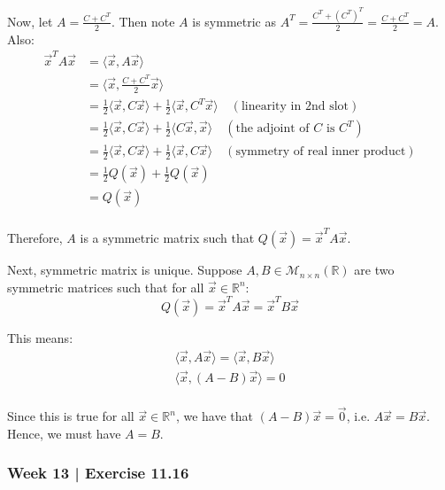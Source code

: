 \begin{pf}[source=Alan]
    Now, let $A = \frac{C + C^T}{2}$. Then note $A$ is symmetric as $A^T
    = \frac{C^T + (C^T)^T} {2} = \frac{C + C^T}{2} = A$. \vsp
    Also:
    \begin{align*}
    \vec{x}^T A \vec{x} &= \langle \vec{x}, A\vec{x} \rangle \\
    &= \langle \vec{x}, \frac{C + C^T}{2} \vec{x} \rangle \\
    &= \frac{1}{2} \langle \vec{x}, C \vec{x} \rangle + \frac{1}{2}
    \langle \vec{x}, C^T \vec{x}
    \rangle \quad (\text{linearity in 2nd slot}) \\
    &= \frac{1}{2} \langle \vec{x}, C \vec{x} \rangle + \frac{1}{2} \langle C
    \vec{x}, \vec{x} \rangle \quad (\text{the adjoint of } C \text{ is } C^T) \\
    &= \frac{1}{2} \langle \vec{x}, C \vec{x} \rangle + \frac{1}{2} \langle
    \vec{x}, C \vec{x} \rangle \quad (\text{symmetry of real inner product}) \\
    &= \frac{1}{2} Q(\vec{x}) + \frac{1}{2} Q(\vec{x}) \\
    &= Q(\vec{x}) \\
    \end{align*}

    Therefore, $A$ is a symmetric matrix such that $Q(\vec{x}) = \vec{x}^T A 
    \vec{x} $. \npgh

    Next,  symmetric matrix is unique.
    Suppose $A,B \in \mathcal{M}_{n \times n}(\mathbb{R})$ are two symmetric
    matrices such that for all $\vec{x} \in \mathbb{R}^n$:
    $$
    Q(\vec{x}) = \vec{x}^T A \vec{x} = \vec{x}^T B \vec{x}
    $$

    This means:
    \begin{gather*}
    \langle \vec{x}, A \vec{x} \rangle = \langle \vec{x}, B \vec{x} \rangle \\
    \langle \vec{x}, (A - B) \vec{x} \rangle = 0 \\
    \end{gather*}

    Since this is true for all $\vec{x} \in \mathbb{R}^n$, we have that
    $(A - B) \vec{x} = \vec{0}$, i.e. $A \vec{x} = B \vec{x}$.
    Hence, we must have $A = B$.
\end{pf}
\newpage
\subsubsection{Week 13 | Exercise 11.16}

